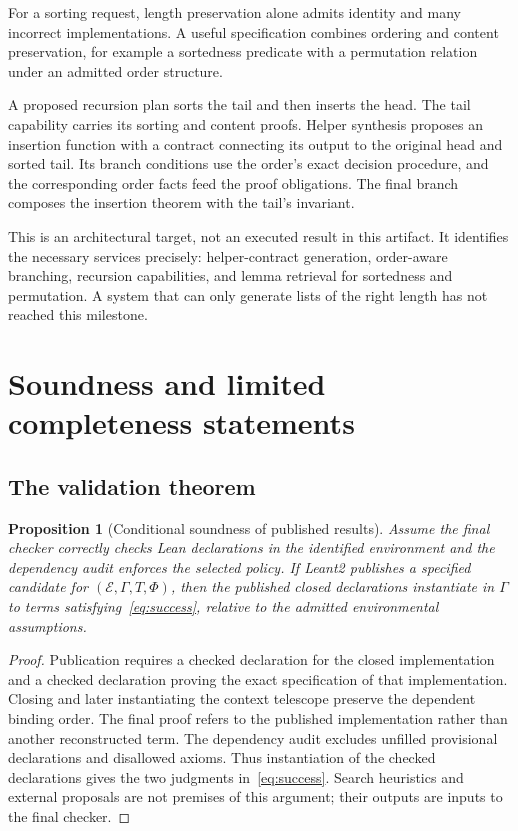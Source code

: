 \documentclass[11pt,letterpaper]{article}
\newcommand{\Spec}{\Phi}
\newcommand{\Ctx}{\Gamma}
\newcommand{\Env}{\mathcal E}
\newtheorem{proposition}{Proposition}[section]
\theoremstyle{definition}
\theoremstyle{remark}
\begin{document}
For a sorting request, length preservation alone admits identity and many incorrect implementations. A useful specification combines ordering and content preservation, for example a sortedness predicate with a permutation relation under an admitted order structure.

A proposed recursion plan sorts the tail and then inserts the head. The tail capability carries its sorting and content proofs. Helper synthesis proposes an insertion function with a contract connecting its output to the original head and sorted tail. Its branch conditions use the order's exact decision procedure, and the corresponding order facts feed the proof obligations. The final branch composes the insertion theorem with the tail's invariant.

This is an architectural target, not an executed result in this artifact. It identifies the necessary services precisely: helper-contract generation, order-aware branching, recursion capabilities, and lemma retrieval for sortedness and permutation. A system that can only generate lists of the right length has not reached this milestone.

\section{Soundness and limited completeness statements}
\label{sec:properties}

\subsection{The validation theorem}

\begin{proposition}[Conditional soundness of published results]
Assume the final checker correctly checks Lean declarations in the identified environment and the dependency audit enforces the selected policy. If Leant2 publishes a specified candidate for $(\Env,\Ctx,T,\Spec)$, then the published closed declarations instantiate in $\Ctx$ to terms satisfying~\eqref{eq:success}, relative to the admitted environmental assumptions.
\end{proposition}
\begin{proof}
Publication requires a checked declaration for the closed implementation and a checked declaration proving the exact specification of that implementation. Closing and later instantiating the context telescope preserve the dependent binding order. The final proof refers to the published implementation rather than another reconstructed term. The dependency audit excludes unfilled provisional declarations and disallowed axioms. Thus instantiation of the checked declarations gives the two judgments in~\eqref{eq:success}. Search heuristics and external proposals are not premises of this argument; their outputs are inputs to the final checker.
\end{proof}
\end{document}
